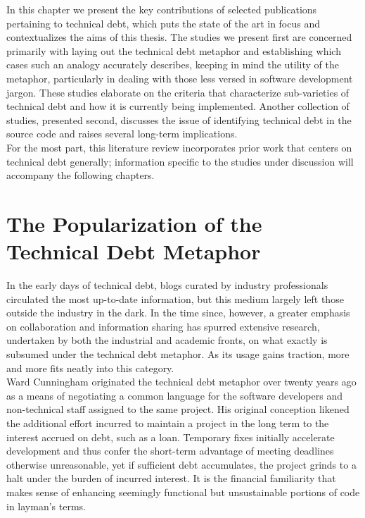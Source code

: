 



In this chapter we present the key contributions of selected publications pertaining to technical debt, which puts the state of the art in focus and contextualizes the aims of this thesis.  The studies we present first are concerned primarily with laying out the technical debt metaphor and establishing which cases such an analogy accurately describes, keeping in mind the utility of the metaphor, particularly in dealing with those less versed in software development jargon.  These studies elaborate on the criteria that characterize sub-varieties of technical debt and how it is currently being implemented.  Another collection of studies, presented second, discusses the issue of identifying technical debt in the source code and raises several long-term implications.\\

For the most part, this literature review incorporates prior work that centers on technical debt generally; information specific to the studies under discussion will accompany the following chapters.


\section{The Popularization of the Technical Debt Metaphor}

In the early days of technical debt, blogs curated by industry professionals circulated the most up-to-date information, but this medium largely left those outside the industry in the dark. In the time since, however, a greater emphasis on collaboration and information sharing has spurred extensive research, undertaken by both the industrial and academic fronts, on what exactly is subsumed under the technical debt metaphor. As its usage gains traction, more and more fits neatly into this category.\\

Ward Cunningham \cite{cunningham1993wycash} originated the technical debt metaphor over twenty years ago as a means of negotiating a common language for the software developers and non-technical staff assigned to the same project. His original conception likened the additional effort incurred to maintain a project in the long term to the interest accrued on debt, such as a loan. Temporary fixes initially accelerate development and thus confer the short-term advantage of meeting deadlines otherwise unreasonable, yet if sufficient debt accumulates, the project grinds to a halt under the burden of incurred interest. It is the financial familiarity that makes sense of enhancing seemingly functional but unsustainable portions of code in layman's terms.\\

